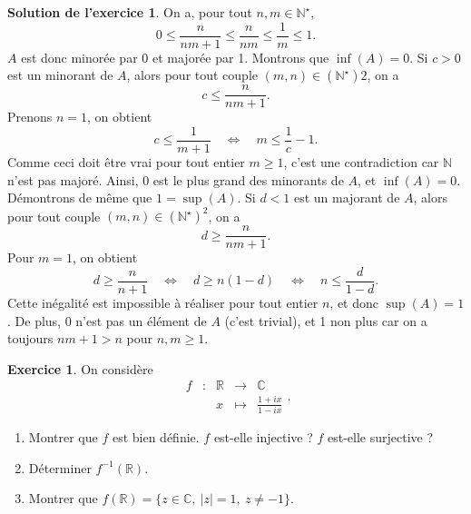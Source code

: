 \documentclass[a4paper, 11pt,openany]{article}%
\theoremstyle{plain}
\theoremstyle{definition}
\newtheorem{exo}{Exercice}
\newtheorem{sol}{Solution de l'exercice}
\theoremstyle{remark}
\newcommand{\R}{\mathbb{R}}
\newcommand{\C}{\mathbb{C}}
\newcommand{\N}{\mathbb{N}}
\begin{document}
\begin{sol}
On a, pour tout $n,m \in \N^{\star}$,
\[0 \leqslant \frac{n}{nm+1} \leqslant \frac{n}{nm} \leqslant \frac{1}{m} \leqslant 1.\]
$A$ est donc minorée par 0 et majorée par 1. Montrons que $\inf(A)=0$. Si $c>0$ est un minorant de $A$, alors pour tout couple $(m,n) \in (\N^{\star})2$, on a 
\[ c \leqslant \frac{n}{nm+1}.\]
Prenons $n=1$, on obtient 
\[ c \leqslant \frac{1}{m+1} \quad \Leftrightarrow \quad m \leqslant \frac{1}{c} - 1.\]
Comme ceci doit être vrai pour tout entier $m\geqslant 1$, c'est une contradiction car $\N$ n'est pas majoré. Ainsi, 0 est le plus grand des minorants de $A$, et $\inf(A)=0$. Démontrons de même que $1=\sup(A)$. Si $d<1$ est un majorant de $A$, alors pour tout couple $(m,n) \in (\N^{\star})^2$, on a \[ d \geqslant \frac{n}{nm+1}.\]
Pour $m=1$, on obtient 
\[ d \geqslant \frac{n}{n+1} \quad \Leftrightarrow \quad d \geqslant n(1-d)  \quad \Leftrightarrow \quad  n \leqslant \frac{d}{1-d}.\]
Cette inégalité est impossible à réaliser pour tout entier $n$, et donc $\sup(A)=1$. De plus, 0 n'est pas un élément de $A$ (c'est trivial), et 1 non plus car on a toujours $nm+1>n$ pour $n,m\geqslant 1$.
\end{sol}




\begin{exo}
On considère
\[ \begin{array}{ccccc}
f & : & \R & \to & \C \\
 & & x & \mapsto & \frac{1+ix}{1-ix}
\end{array} .\]
\begin{enumerate}
 \item Montrer que $f$ est bien définie. $f$ est-elle injective ? $f$ est-elle surjective ?
 \item Déterminer $f^{-1}(\mathbb R)$.
 \item Montrer que $f(\mathbb R)=\{z\in\mathbb C,\ |z|=1,\ z\neq-1\}$.
\end{enumerate}
\end{exo}
\end{document}

